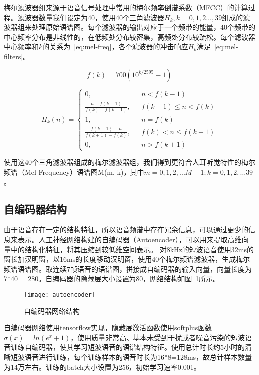 梅尔滤波器组来源于语音信号处理中常用的梅尔频率倒谱系数（MFCC）的计算过程。滤波器数量我们设定为40，使用40个三角滤波器$H_k, k=0,1,2...,39$组成的滤波器组来处理原始语谱图。每个滤波器的输出对应于一个频带的能量，40个频带的中心频率分布是非线性的，在低频处分布较密集，高频处分布较疏松。每个滤波器中心频率和$k$的关系为~\ref{eq:mel-freq}，各个滤波器的冲击响应$H_k$满足~\ref{eq:mel-filters}。

\begin{equation}\label{eq:mel-freq}
f(k) = 700(10^{k/2595}-1)
\end{equation}

\begin{equation}\label{eq:mel-filters}
H_k(n) = \left\{
    \begin{array}{rcl}
    0, && {n<f(k-1)} \\
    \frac{n-f(k-1)}{f(k)-f(k-1)}, && {f(k-1)\leq n < f(k)} \\
    1, && {n=f(k)} \\
    \frac{f(k+1)-n}{f(k+1)-f(k)}, && {f(k) < n \leq f(k+1)} \\
    0, && {n > f(k+1)}
    \end{array} \right.
\end{equation}

使用这40个三角滤波器组成的梅尔滤波器组，我们得到更符合人耳听觉特性的梅尔频谱（Mel-Frequency）语谱图M(m, k)，其中$m=0,1,2,...M-1; k=0,1,2,…39$。

\subsection{自编码器结构}

由于语音存在一定的结构特征，所以语音频谱中存在冗余信息，可以通过更少的信息来表示。人工神经网络构建的自编码器（Autoencoder），可以用来提取高维向量中的结构化特征，将其压缩到较低维空间表示。
对8kHz的短波语音使用32ms的窗长加汉明窗，以16ms的长度移动汉明窗，使用40个梅尔频谱滤波器，生成梅尔频谱语谱图。取连续7帧语音的语谱图，拼接成自编码器的输入向量，向量长度为7*40 = 280。自编码器的隐藏层大小设置为80，网络结构如图~\ref{fig:autoencoder}所示。

\begin{figure}
\centering
\texttt{[image: autoencoder]}
\caption{自编码器网络结构\label{fig:autoencoder}}
\end{figure}

自编码器网络使用tensorflow\cite{abadi2016tensorflow}实现，隐藏层激活函数使用softplus函数$\sigma(x)=ln⁡(e^x+1)$，使用质量非常高、基本未受到干扰或者噪音污染的短波语音训练自编码器，使其学习短波语音的语谱结构特征。使用总计时长约5小时的清晰短波语音进行训练，每个训练样本的语音时长为16*8=128ms，故总计样本数量为14万左右。训练的batch大小设置为256，初始学习速率0.001。


